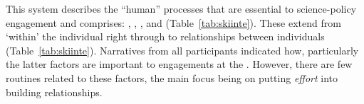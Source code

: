 
This system describes the ``human'' processes that are essential to science-policy engagement and comprises: \skivalu, \skiagen, \skipers, \skiopin{} and \skinetw{} (Table~\ref{tab:skiinte}). These extend from `within' the individual right through to relationships between individuals (Table~\ref{tab:skiinte}). Narratives from all participants indicated how, particularly the latter factors are important to engagements at the \SPI. However, there are few routines related to these factors, the main focus being on putting \emph{effort} into building relationships.

\subsubsection{\titvalu}\label{sec:resskivalu}

